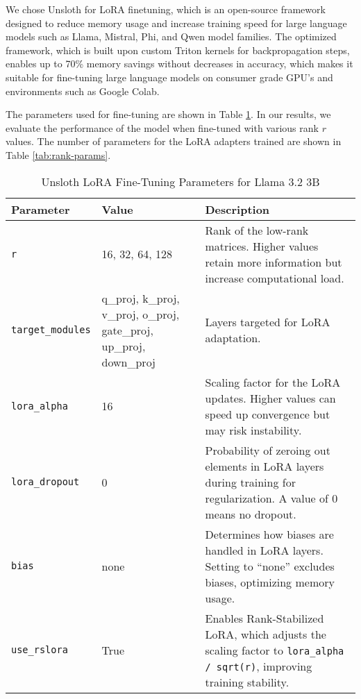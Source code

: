 We chose Unsloth for LoRA finetuning, which is an open-source framework designed to reduce memory usage and increase training speed for large language models such as Llama, Mistral, 
Phi, and Qwen model families. The optimized framework, which is built upon custom Triton kernels for backpropagation steps, enables up to 70\% memory savings without decreases in 
accuracy, which makes it suitable for fine-tuning large language models on consumer grade GPU's and environments such as Google Colab. 

The parameters used for fine-tuning are shown in Table \ref{tab:lora-parameters}. In our results, we evaluate the performance of the model when fine-tuned with various rank $\mathit{r}$ values.
The number of parameters for the LoRA adapters trained are shown in Table \ref{tab:rank-params}.


\begin{table}[t]
    \centering
    \caption{Unsloth LoRA Fine-Tuning Parameters for Llama 3.2 3B}
    \label{tab:lora-parameters}
    \begin{tabular}{l p{2cm} p{8.2cm}}
    \toprule
    \textbf{Parameter} & \textbf{Value} & \textbf{Description} \\
    \midrule
    \texttt{r} & 16, 32, 64, 128 & Rank of the low-rank matrices. Higher values retain more information but increase computational load. \\
    \addlinespace[3pt]
    \texttt{target\_modules} & q\_proj, k\_proj, v\_proj, o\_proj, gate\_proj, up\_proj, down\_proj & 
    Layers targeted for LoRA adaptation. \\
    \addlinespace[3pt]
    \texttt{lora\_alpha} & 16 & Scaling factor for the LoRA updates. Higher values can speed up convergence but may risk instability. \\
    \addlinespace[3pt]
    \texttt{lora\_dropout} & 0 & Probability of zeroing out elements in LoRA layers during training for regularization. A value of 0 means no dropout. \\
    \addlinespace[3pt]
    \texttt{bias} & none & Determines how biases are handled in LoRA layers. Setting to ``none'' excludes biases, optimizing memory usage. \\
    \addlinespace[3pt]
    \texttt{use\_rslora} & True & Enables Rank-Stabilized LoRA, which adjusts the scaling factor to \texttt{lora\_alpha / sqrt(r)}, improving training stability. \\
    \bottomrule
    \end{tabular}
 \end{table}

